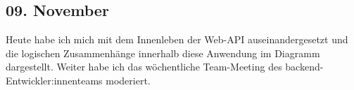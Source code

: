 \subsection{09. November}
Heute habe ich mich mit dem Innenleben der Web-API auseinandergesetzt und die logischen Zusammenhänge innerhalb diese Anwendung im Diagramm dargestellt. Weiter habe ich das wöchentliche Team-Meeting des backend-Entwickler:innenteams moderiert. 